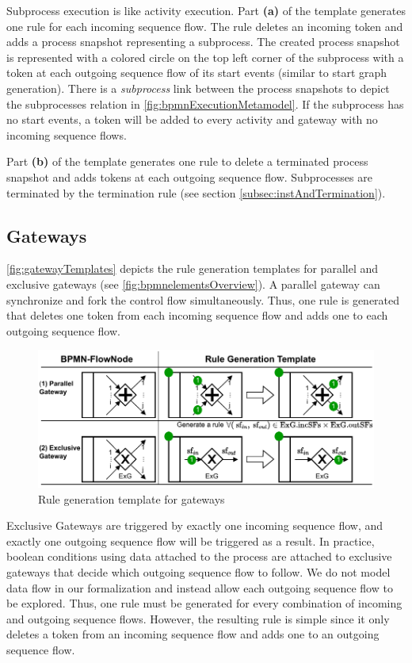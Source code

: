 \documentclass{lmcs} %
\begin{document}
Subprocess execution is like activity execution.
Part \textbf{(a)} of the template generates one rule for each incoming sequence flow.
The rule deletes an incoming token and adds a process snapshot representing a subprocess. 
The created process snapshot is represented with a colored circle on the top left corner of the subprocess with a token at each outgoing sequence flow of its start events (similar to start graph generation).
There is a \textit{subprocess} link between the process snapshots to depict the \textsf{subprocesses} relation in \autoref{fig:bpmnExecutionMetamodel}.
If the subprocess has no start events, a token will be added to every activity and gateway with no incoming sequence flows.

Part \textbf{(b)} of the template generates one rule to delete a terminated process snapshot and adds tokens at each outgoing sequence flow.
Subprocesses are terminated by the termination rule (see section \ref{subsec:instAndTermination}).


\subsection{Gateways}
\autoref{fig:gatewayTemplates} depicts the rule generation templates for parallel and exclusive gateways (see \autoref{fig:bpmnelementsOverview}).
A parallel gateway can synchronize and fork the control flow simultaneously.
Thus, one rule is generated that deletes one token from each incoming sequence flow and adds one to each outgoing sequence flow.

\begin{figure}[ht]
    \centering
    \includegraphics[width=1\textwidth]{images/gateways_template.pdf}
    \caption{Rule generation template for gateways}
    \label{fig:gatewayTemplates}
\end{figure}

Exclusive Gateways are triggered by exactly one incoming sequence flow, and exactly one outgoing sequence flow will be triggered as a result.
In practice, boolean conditions using data attached to the process are attached to exclusive gateways that decide which outgoing sequence flow to follow.
We do not model data flow in our formalization and instead allow each outgoing sequence flow to be explored. 
Thus, one rule must be generated for every combination of incoming and outgoing sequence flows.
However, the resulting rule is simple since it only deletes a token from an incoming sequence flow and adds one to an outgoing sequence flow.
\end{document}

